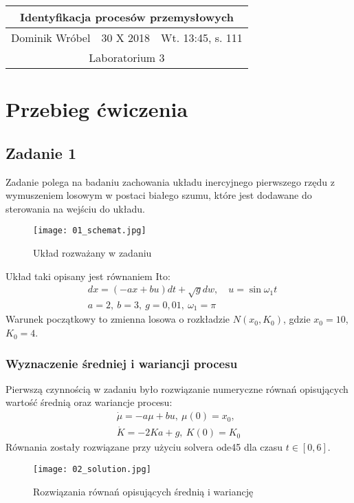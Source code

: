 \documentclass[a4paper,15pt]{article}
\begin{document}

\begin{table}
\begin{center}
\begin{tabular}{|l|l|l|}
\hline
\multicolumn{3}{|c|}{\textbf{Identyfikacja procesów przemysłowych}} \\ \hline Dominik Wróbel & 30 X 2018 & Wt. 13:45, s. 111 \\ \hline
\multicolumn{3}{|c|}{Laboratorium 3} \\ \hline 
\end{tabular}
\end{center}
\end{table}


\section{Przebieg ćwiczenia}
\subsection{Zadanie 1 }

Zadanie polega na badaniu zachowania układu inercyjnego pierwszego rzędu z wymuszeniem losowym w postaci białego szumu, które jest dodawane do sterowania na wejściu do układu. 
\begin{figure}[H]
\centerline{\texttt{[image: 01\_schemat.jpg]}}
\centering
\caption{Układ rozważany w zadaniu}
\label{fig:01_schemat}
\end{figure}
Układ taki opisany jest równaniem Ito:
\begin{align*}
& dx = (-ax + bu)dt + \sqrt{g}dw,\quad u=\sin \omega_1 t \\
& a = 2, \ b = 3, \ g = 0,01, \ \omega_1 = \pi
\end{align*}
Warunek początkowy to zmienna losowa o rozkładzie \( N(x_0, K_0) \), gdzie \( x_0=10 \), \(K_0=4\).

\subsubsection{Wyznaczenie średniej i wariancji procesu}

Pierwszą czynnością w zadaniu było rozwiązanie numeryczne równań opisujących wartość średnią oraz wariancje procesu:
\begin{align*}
\dot{\mu} = -a\mu + bu, \ \mu(0)=x_0, \\
\dot{K} = -2Ka+g, \ K(0)=K_0
\end{align*}
Równania zostały rozwiązane przy użyciu solvera ode45 dla czasu \( t \in [0,6]\).
\begin{figure}[H]
\centerline{\texttt{[image: 02\_solution.jpg]}}
\centering
\caption{Rozwiązania równań opisujących średnią i wariancję}
\label{fig:02_solution}
\end{figure}
\end{document}
